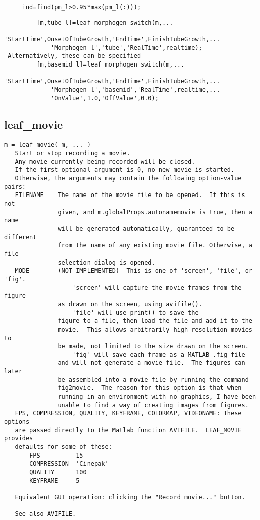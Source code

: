 \begin{verbatim}
     ind=find(pm_l>0.95*max(pm_l(:)));
\end{verbatim}

\begin{verbatim}
         [m,tube_l]=leaf_morphogen_switch(m,...
             'StartTime',OnsetOfTubeGrowth,'EndTime',FinishTubeGrowth,...
             'Morphogen_l','tube','RealTime',realtime);
 Alternatively, these can be specified
         [m,basemid_l]=leaf_morphogen_switch(m,...
             'StartTime',OnsetOfTubeGrowth,'EndTime',FinishTubeGrowth,...
             'Morphogen_l','basemid','RealTime',realtime,...
             'OnValue',1.0,'OffValue',0.0);
\end{verbatim}

\subsection{leaf\_movie}\label{section-leaf-movie}

\begin{verbatim}
m = leaf_movie( m, ... )
   Start or stop recording a movie.
   Any movie currently being recorded will be closed.
   If the first optional argument is 0, no new movie is started.
   Otherwise, the arguments may contain the following option-value pairs:
   FILENAME    The name of the movie file to be opened.  If this is not
               given, and m.globalProps.autonamemovie is true, then a name
               will be generated automatically, guaranteed to be different
               from the name of any existing movie file. Otherwise, a file
               selection dialog is opened.
   MODE        (NOT IMPLEMENTED)  This is one of 'screen', 'file', or 'fig'.
                   'screen' will capture the movie frames from the figure
               as drawn on the screen, using avifile().
                   'file' will use print() to save the
               figure to a file, then load the file and add it to the
               movie.  This allows arbitrarily high resolution movies to
               be made, not limited to the size drawn on the screen.
                   'fig' will save each frame as a MATLAB .fig file
               and will not generate a movie file.  The figures can later
               be assembled into a movie file by running the command
               fig2movie.  The reason for this option is that when
               running in an environment with no graphics, I have been
               unable to find a way of creating images from figures.
   FPS, COMPRESSION, QUALITY, KEYFRAME, COLORMAP, VIDEONAME: These options
   are passed directly to the Matlab function AVIFILE.  LEAF_MOVIE provides
   defaults for some of these:
       FPS          15
       COMPRESSION  'Cinepak'
       QUALITY      100
       KEYFRAME     5

   Equivalent GUI operation: clicking the "Record movie..." button.

   See also AVIFILE.
\end{verbatim}

